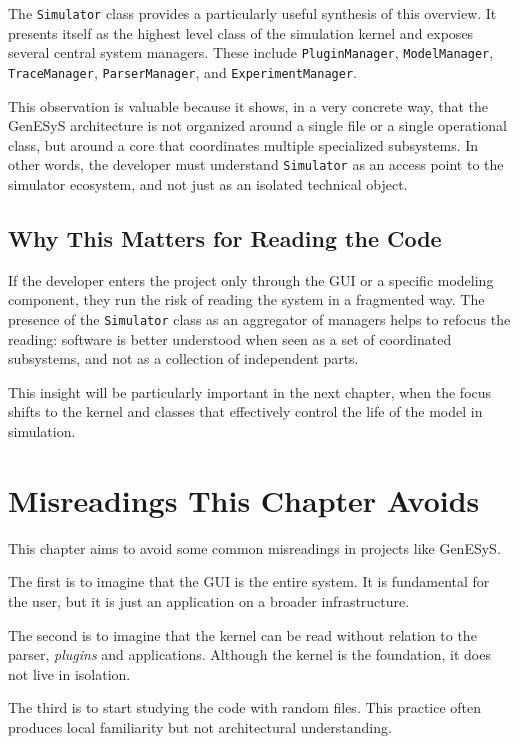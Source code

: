The \texttt{Simulator} class provides a particularly useful synthesis of this overview. It presents itself as the highest level class of the simulation kernel and exposes several central system managers. These include \texttt{PluginManager}, \texttt{ModelManager}, \texttt{TraceManager}, \texttt{ParserManager}, and \texttt{ExperimentManager}.

This observation is valuable because it shows, in a very concrete way, that the GenESyS architecture is not organized around a single file or a single operational class, but around a core that coordinates multiple specialized subsystems. In other words, the developer must understand \texttt{Simulator} as an access point to the simulator ecosystem, and not just as an isolated technical object.

\subsection{Why This Matters for Reading the Code}
\label{subsec:cap6_por_que_importa_leitura_codigo}

If the developer enters the project only through the GUI or a specific modeling component, they run the risk of reading the system in a fragmented way. The presence of the \texttt{Simulator} class as an aggregator of managers helps to refocus the reading: software is better understood when seen as a set of coordinated subsystems, and not as a collection of independent parts.

This insight will be particularly important in the next chapter, when the focus shifts to the kernel and classes that effectively control the life of the model in simulation.

\section{Misreadings This Chapter Avoids}
\label{sec:cap6_leituras_erradas_evita}

This chapter aims to avoid some common misreadings in projects like GenESyS.

The first is to imagine that the GUI is the entire system. It is fundamental for the user, but it is just an application on a broader infrastructure.

The second is to imagine that the kernel can be read without relation to the parser, \textit{plugins} and applications. Although the kernel is the foundation, it does not live in isolation.

The third is to start studying the code with random files. This practice often produces local familiarity but not architectural understanding.

